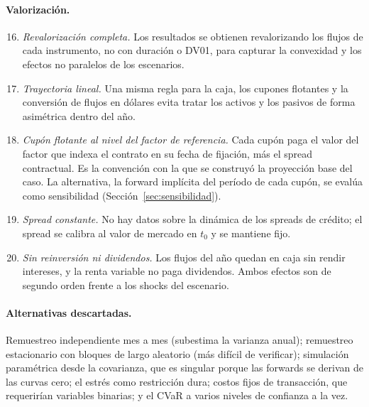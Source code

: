 \paragraph{Valorización.}
\begin{enumerate}\setcounter{enumi}{15}
  \item \emph{Revalorización completa.} Los resultados se obtienen revalorizando los flujos de cada instrumento, no
  con duración o DV01, para capturar la convexidad y los efectos no paralelos de los escenarios.
  \item \emph{Trayectoria lineal.} Una misma regla para la caja, los cupones flotantes y la conversión de flujos en
  dólares evita tratar los activos y los pasivos de forma asimétrica dentro del año.
  \item \emph{Cupón flotante al nivel del factor de referencia.} Cada cupón paga el valor del factor que indexa el
  contrato en su fecha de fijación, más el spread contractual. Es la convención con la que se construyó la
  proyección base del caso. La alternativa, la forward implícita del período de cada cupón, se evalúa como
  sensibilidad (Sección~\ref{sec:sensibilidad}).
  \item \emph{Spread constante.} No hay datos sobre la dinámica de los spreads de crédito; el spread se calibra
  al valor de mercado en $t_0$ y se mantiene fijo.
  \item \emph{Sin reinversión ni dividendos.} Los flujos del año quedan en caja sin rendir intereses, y la renta
  variable no paga dividendos. Ambos efectos son de segundo orden frente a los shocks del escenario.
\end{enumerate}

\paragraph{Alternativas descartadas.} Remuestreo independiente mes a mes (subestima la varianza anual);
remuestreo estacionario con bloques de largo aleatorio (más difícil de verificar); simulación paramétrica
desde la covarianza, que es singular porque las forwards se derivan de las curvas cero; el estrés como
restricción dura; costos fijos de transacción, que requerirían variables binarias; y el CVaR a varios
niveles de confianza a la vez.
